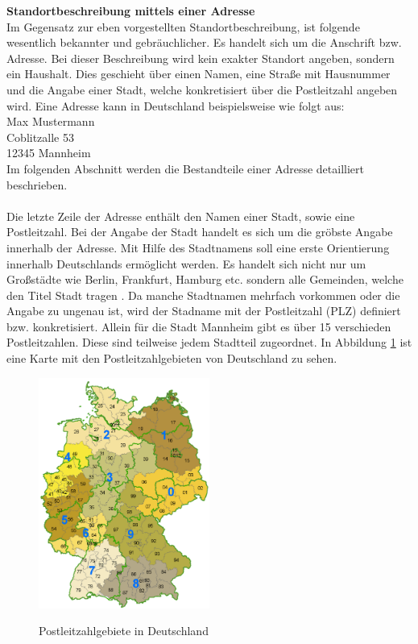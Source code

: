 \textbf{Standortbeschreibung mittels einer Adresse}
\\Im Gegensatz zur eben vorgestellten Standortbeschreibung, ist folgende wesentlich bekannter und gebräuchlicher. Es handelt sich um die Anschrift bzw. Adresse. Bei dieser Beschreibung wird kein exakter Standort angeben, sondern ein Haushalt. Dies geschieht über einen Namen, eine Straße mit Hausnummer und die Angabe einer Stadt, welche konkretisiert über die Postleitzahl angeben wird.  
Eine Adresse kann in Deutschland beispielsweise wie folgt aus:
\\Max Mustermann 
\\Coblitzalle 53
\\12345 Mannheim
\\Im folgenden Abschnitt werden die Bestandteile einer Adresse detailliert beschrieben.
\\
\\Die letzte Zeile der Adresse enthält den Namen einer Stadt, sowie eine Postleitzahl. Bei der Angabe der Stadt handelt es sich um die gröbste Angabe innerhalb der Adresse. Mit Hilfe des Stadtnamens soll eine erste Orientierung innerhalb Deutschlands ermöglicht werden. Es handelt sich nicht nur um Großstädte wie Berlin, Frankfurt, Hamburg etc. sondern alle Gemeinden, welche den Titel Stadt tragen .
Da manche Stadtnamen mehrfach vorkommen oder die Angabe zu ungenau ist, wird der Stadname mit der Postleitzahl (PLZ) definiert bzw. konkretisiert. Allein für die Stadt Mannheim gibt es über 15 verschieden Postleitzahlen. Diese sind teilweise jedem Stadtteil zugeordnet. In Abbildung \ref{fig:Postleitzahlgebiete} ist eine Karte mit den Postleitzahlgebieten von Deutschland zu sehen.



\begin{figure}
  \centering
    \includegraphics[width=0.50\textwidth]{ref/images/plzgebiete.png}
   \caption{Postleitzahlgebiete in Deutschland}
  \label{fig:Postleitzahlgebiete}
   \cite{PLZGebiete}
\end{figure}


